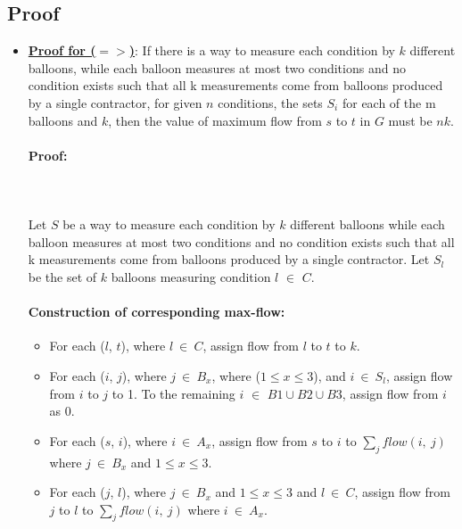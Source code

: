 \documentclass[pdftex,a4paper,12pt]{report}
\begin{document}
\subsection{Proof}

\begin{itemize}
\item \textbf{\underline{Proof for ($=>$)}}: If there is a way to measure each condition by $k$ different balloons, while each balloon measures at most two conditions and no condition exists such that all k measurements come from balloons produced by a single contractor, for given $n$ conditions, the sets $S_i$ for each of the m balloons and $k$, then the value of maximum flow from $s$ to $t$ in $G$ must be $nk$.
\paragraph{Proof:} \makebox[2pt]{}\\\\
Let $S$ be a way to measure each condition by $k$ different balloons while each balloon measures at most two conditions and no condition exists such that all k measurements come from balloons produced by a single contractor. Let $S_l$ be the set of $k$ balloons measuring condition $l$ $\in$ $C$.
\paragraph{Construction of corresponding max-flow:} 
    \begin{itemize}
    \item For each ($l$, $t$), where $l\ \in\ C$, assign flow from $l$ to $t$ to $k$.
    \item For each ($i$, $j$), where $j\ \in\ B_x$, where ($1 \leq x \leq 3$), and $i\ \in\ S_l$, assign flow from $i$ to $j$ to 1. To the remaining $i$ $\in$ $B1 \cup B2 \cup B3$, assign flow from $i$ as 0.
    \item For each ($s$, $i$), where $i\ \in\ A_x$, assign flow from $s$ to $i$ to $\sum _j flow(i,\ j)$ where $j\ \in\ B_x$ and $1 \leq x \leq 3$.
    \item For each ($j$, $l$), where $j\ \in\ B_x$ and $1 \leq x \leq 3$ and $l\ \in\ C$, assign flow from $j$ to $l$ to $\sum _j flow(i,\ j)$ where $i\ \in\ A_x$.
    \end{itemize}


\end{itemize}
\end{document}
